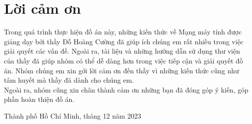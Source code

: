 \setcounter{secnumdepth}{0}
\section{Lời cảm ơn}
Trong quá trình thực hiện đồ án này, những kiến thức về Mạng máy tính được giảng dạy bởi thầy Đỗ Hoàng Cường đã giúp ích chúng em rất nhiều trong việc giải quyết các vấn đề. Ngoài ra, tài liệu và những hướng dẫn sử dụng thư viện của thầy đã giúp nhóm có thể dễ dàng hơn trong việc tiếp cận và giải quyết đồ án. Nhóm chúng em xin gởi lời cảm ơn đến thầy vì những kiến thức cũng như tâm huyết mà thầy đã dành cho chúng em.\\
Ngoài ra, nhóm cũng xin chân thành cảm ơn những bạn đã đóng góp ý kiến, góp phần hoàn thiện đồ án.
\begin{flushright}
Thành phố Hồ Chí Minh, tháng 12 năm 2023
\end{flushright}